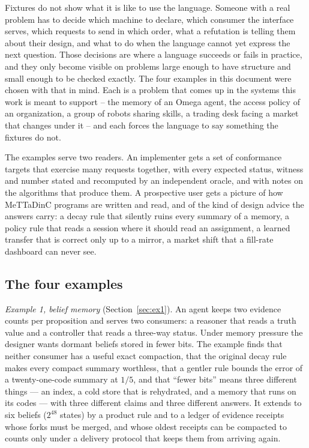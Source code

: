 \documentclass[11pt]{article}
\theoremstyle{definition}
\theoremstyle{plain}
\begin{document}
Fixtures do not show what it is like to use the language. Someone with a real problem has to
decide which machine to declare, which consumer the interface serves, which requests to send in
which order, what a refutation is telling them about their design, and what to do when the
language cannot yet express the next question. Those decisions are where a language succeeds or
fails in practice, and they only become visible on problems large enough to have structure and
small enough to be checked exactly. The four examples in this document were chosen with that in
mind. Each is a problem that comes up in the systems this work is meant to support -- the memory
of an Omega agent, the access policy of an organization, a group of robots sharing skills, a
trading desk facing a market that changes under it -- and each forces the language to say
something the fixtures do not.

The examples serve two readers. An implementer gets a set of conformance targets that exercise
many requests together, with every expected status, witness and number stated and recomputed by
an independent oracle, and with notes on the algorithms that produce them. A prospective user gets
a picture of how MeTTaDinC programs are written and read, and of the kind of design advice the
answers carry: a decay rule that silently ruins every summary of a memory, a policy rule that reads
a session where it should read an assignment, a learned transfer that is correct only up to a
mirror, a market shift that a fill-rate dashboard can never see.

\subsection{The four examples}

\emph{Example 1, belief memory} (Section~\ref{sec:ex1}). An agent keeps two evidence counts per
proposition and serves two consumers: a reasoner that reads a truth value and a controller that
reads a three-way status. Under memory pressure the designer wants dormant beliefs stored in fewer
bits. The example finds that neither consumer has a useful exact compaction, that the original
decay rule makes every compact summary worthless, that a gentler rule bounds the error of a
twenty-one-code summary at $1/5$, and that ``fewer bits'' means three different things --- an index,
a cold store that is rehydrated, and a memory that runs on its codes --- with three different
claims and three different answers. It extends to six beliefs ($2^{48}$ states) by a product rule
and to a ledger of evidence receipts whose forks must be merged, and whose oldest receipts can be
compacted to counts only under a delivery protocol that keeps them from arriving again.
\end{document}
